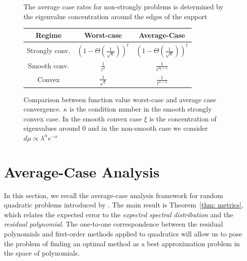 \documentclass{article}
\begin{document}
\begin{figure}[!htb]
\begin{minipage}{0.45\textwidth}
\begin{small}
\caption{The average case rates for non-strongly problems is determined by the eigenvalue concentration around the edges of the support }
\end{small}
\end{minipage}%
\hfill
\begin{minipage}{0.45 \textwidth} \vspace{0 cm } %
\begin{small}
\captionsetup{type=table} %
    \begin{tabular}{c|c|c}
         Regime&Worst-case& Average-Case  \\
         \hline
         Strongly conv. & $\left(1-\Theta(\frac{1}{\sqrt{\kappa}})\right)^t$ &
         $\left(1-\Theta(\frac{1}{\sqrt{\kappa}})\right)^t$\\ 
         \hline
         Smooth conv. & $\frac{1}{t^2}$ & $\frac{1}{t^{2\xi+4}}$\\
         \hline
          Convex& $\frac{1}{\sqrt{t}}$ & $\frac{1}{t^{\alpha+2}}$
    \end{tabular}
    \vspace{ 0.5 cm}
    \caption{Comparison between function value worst-case and average case convergence. $\kappa$ is the condition number in the smooth strongly convex case. In the smooth convex case $\xi$ is the concentration of eigenvalues around $0$ and in the non-smooth case we consider $d\mu\propto \lambda^\alpha e^{-x}$ }\label{table: rates}

\end{small}

\end{minipage}


\end{figure}
\section{Average-Case Analysis} \label{section: average case}


In this section, we recall the average-case analysis framework for random quadratic problems introduced by \cite{pedregosa2020acceleration}.
The main result is Theorem~\ref{thm: metrics}, which relates the expected error  to the \textit{expected spectral distribution} and the \textit{residual polynomial}. The one-to-one correspondence between the residual polynomials and first-order methods applied to quadratics will allow us  to pose the problem of finding an optimal method as a best approximation problem in the space of polynomials.
\end{document}
